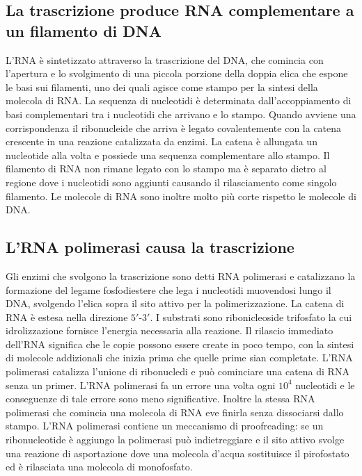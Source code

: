 \subsection{La trascrizione produce RNA complementare a un filamento di DNA}
L'RNA \`e sintetizzato attraverso la trascrizione del DNA, che comincia con l'apertura e lo svolgimento di una piccola porzione della doppia elica che espone le basi sui filamenti, uno
dei quali agisce come stampo per la sintesi della molecola di RNA. La sequenza di nucleotidi \`e determinata dall'accoppiamento di basi complementari tra i nucleotidi che arrivano e lo
stampo. Quando avviene una corrispondenza il ribonucleide che arriva \`e legato covalentemente con la catena crescente in una reazione catalizzata da enzimi. La catena \`e allungata un
nucleotide alla volta e possiede una sequenza complementare allo stampo. Il filamento di RNA non rimane legato con lo stampo ma \`e separato dietro al regione dove i nucleotidi sono
aggiunti causando il rilasciamento come singolo filamento. Le molecole di RNA sono inoltre molto pi\`u corte rispetto le molecole di DNA. 
\subsection{L'RNA polimerasi causa la trascrizione}
Gli enzimi che svolgono la trascrizione sono detti RNA polimerasi e catalizzano la formazione del legame fosfodiestere che lega i nucleotidi muovendosi lungo il DNA, svolgendo l'elica
sopra il sito attivo per la polimerizzazione. La catena di RNA \`e estesa nella direzione $5'$-$3'$. I substrati sono ribonicleoside trifosfato la cui idrolizzazione fornisce l'energia
necessaria alla reazione. Il rilascio immediato dell'RNA significa che le copie possono essere create in poco tempo, con la sintesi di molecole addizionali che inizia prima che quelle
prime sian completate. L'RNA polimerasi catalizza l'unione di ribonucledi e pu\`o cominciare una catena di RNA senza un primer. L'RNA polimerasi fa un errore una volta ogni $10^4$ 
nucleotidi e le conseguenze di tale errore sono meno significative. Inoltre la stessa RNA polimerasi che comincia una molecola di RNA eve finirla senza dissociarsi dallo stampo. L'RNA
polimerasi contiene un meccanismo di proofreading: se un ribonucleotide \`e aggiungo la polimerasi pu\`o indietreggiare e il sito attivo svolge una reazione di asportazione dove una
molecola d'acqua sostituisce il pirofostato ed \`e rilasciata una molecola di monofosfato. 
